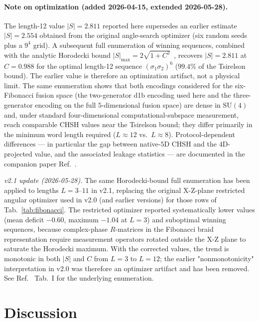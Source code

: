 \documentclass[aps,pra,twocolumn,superscriptaddress,showpacs,floatfix]{revtex4-2}
\begin{document}
\paragraph{Note on optimization (added 2026-04-15, extended 2026-05-28).}
The length-12 value $|S| = 2.811$ reported here supersedes an earlier estimate
$|S| = 2.554$ obtained from the original angle-search optimizer (six random
seeds plus a $9^4$ grid). A subsequent full enumeration of winning sequences,
combined with the analytic Horodecki bound
$|S|_{\max} = 2\sqrt{1+C^2}$~\cite{Horodecki1995}, recovers $|S| = 2.811$ at
$C = 0.988$ for the optimal length-12 sequence $(\sigma_1\sigma_2)^6$
($99.4\%$ of the Tsirelson bound).
The earlier value is therefore an optimization artifact, not a physical limit.
The same enumeration shows that both encodings considered for the six-Fibonacci
fusion space (the two-generator d1b encoding used here and the three-generator
encoding on the full $5$-dimensional fusion space) are dense in $\mathrm{SU}(4)$
and, under standard four-dimensional computational-subspace measurement,
reach comparable CHSH values near the Tsirelson bound; they differ primarily
in the minimum word length required ($L \approx 12$ vs.\ $L \approx 8$).
Protocol-dependent differences --- in particular the gap between native-$5$D
CHSH and the $4$D-projected value, and the associated leakage statistics ---
are documented in the companion paper
Ref.~\cite{Sayim2026fibonacci}.

\smallskip
\textit{v2.1 update (2026-05-28).}
The same Horodecki-bound full enumeration has been applied to lengths
$L = 3$--$11$ in v2.1, replacing the original X-Z-plane restricted angular
optimizer used in v2.0 (and earlier versions) for those rows of
Tab.~\ref{tab:fibonacci}.  The restricted optimizer reported systematically
lower values (mean deficit ${-}0.60$, maximum ${-}1.04$ at $L = 3$) and
suboptimal winning sequences, because complex-phase $R$-matrices in the Fibonacci
braid representation require measurement operators rotated outside the X-Z
plane to saturate the Horodecki maximum.  With the corrected values, the trend
is monotonic in both $|S|$ and $C$ from $L=3$ to $L=12$; the earlier
"nonmonotonicity" interpretation in v2.0 was therefore an optimizer artifact
and has been removed.  See Ref.~\cite{Sayim2026fibonacci} Tab.~I for the underlying
enumeration.

\section{Discussion}
\label{sec:discussion}
\end{document}
